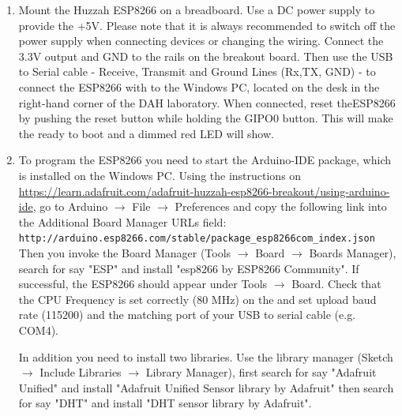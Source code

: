 \begin{enumerate}

\item Mount the Huzzah ESP8266 \microcontroller on a breadboard. 
Use a DC power supply to provide the +5V. 
Please note that it is always recommended to switch off the power supply when connecting devices or changing the wiring.
Connect the 3.3V output and GND to the rails on the breakout board. 
Then use the USB  to Serial cable - Receive, Transmit and Ground Lines (Rx,TX, GND) -
to connect the ESP8266 with to the Windows PC, 
located on the desk in the right-hand corner of the DAH laboratory. 
When connected, reset  theESP8266 by  pushing the
reset button while holding the GIPO0 button. 
This will make the \microcontroller ready to boot 
and a dimmed red LED will show.

\item To program the  ESP8266  you need to start the Arduino-IDE package, 
which is installed on the Windows PC. Using the instructions on
\url{https://learn.adafruit.com/adafruit-huzzah-esp8266-breakout/using-arduino-ide},
go to Arduino $\rightarrow$ File $\rightarrow$ Preferences and copy the following link into
the Additional Board Manager URLs field: 
\hspace*{5mm} {\tt http://arduino.esp8266.com/stable/package\_esp8266com\_index.json}\\
Then you invoke  the Board Manager (Tools $\rightarrow$ Board $\rightarrow$ Boards Manager),
search for say "ESP" and install "esp8266 by ESP8266 Community".
If successful, the  ESP8266 should appear under Tools $\rightarrow$ Board. 
Check that the CPU Frequency is set correctly (80 MHz) on the \microcontroller
and set upload baud rate (115200)  and the matching port of your USB to serial cable (e.g. COM4).

In addition you need to install two libraries.
Use the library manager (Sketch $\rightarrow$  Include Libraries $\rightarrow$ Library Manager), first  search for  say "Adafruit Unified" and install "Adafruit Unified Sensor library by Adafruit" then search for say "DHT" and install "DHT sensor library by Adafruit".



\end{enumerate}
